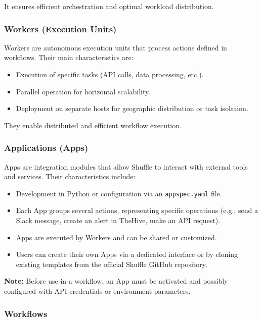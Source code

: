 It ensures efficient orchestration and optimal workload distribution.

\subsubsection{Workers (Execution Units)}

Workers are autonomous execution units that process actions defined in workflows. Their main characteristics are:

\begin{itemize}
    \item Execution of specific tasks (API calls, data processing, etc.).
    \item Parallel operation for horizontal scalability.
    \item Deployment on separate hosts for geographic distribution or task isolation.
\end{itemize}

They enable distributed and efficient workflow execution.

\subsubsection{Applications (Apps)}

Apps are integration modules that allow Shuffle to interact with external tools and services. Their characteristics include:

\begin{itemize}
    \item Development in Python or configuration via an \texttt{appspec.yaml} file.
    \item Each App groups several actions, representing specific operations (e.g., send a Slack message, create an alert in TheHive, make an API request).
    \item Apps are executed by Workers and can be shared or customized.
    \item Users can create their own Apps via a dedicated interface or by cloning existing templates from the official Shuffle GitHub repository.
\end{itemize}

\textbf{Note:} Before use in a workflow, an App must be activated and possibly configured with API credentials or environment parameters.

\subsubsection{Workflows}

